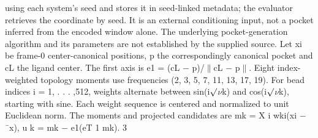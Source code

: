 \documentclass[11pt]{article}
\begin{document}
using each system’s seed and stores it in seed-linked metadata; the evaluator retrieves the coordinate
by seed. It is an external conditioning input, not a pocket inferred from the encoded window alone.
The underlying pocket-generation algorithm and its parameters are not established by the supplied
source. Let xi be frame-0 center-canonical positions, p the correspondingly canonical pocket and cL
the ligand center. The first axis is e1 = (cL \ensuremath{-} p)/\ensuremath{\parallel}cL \ensuremath{-} p\ensuremath{\parallel}. Eight index-weighted topology moments
use frequencies (2, 3, 5, 7, 11, 13, 17, 19). For bead indices i = 1, . . . ,512, weights alternate between
sin(i\ensuremath{\surd}\ensuremath{\nu}k) and cos(i\ensuremath{\surd}\ensuremath{\nu}k), starting with sine. Each weight sequence is centered and normalized to
unit Euclidean norm. The moments and projected candidates are
mk =
X
i
wki(xi \ensuremath{-} ¯x), u k = mk \ensuremath{-} e1(eT
1 mk).
3
\end{document}
